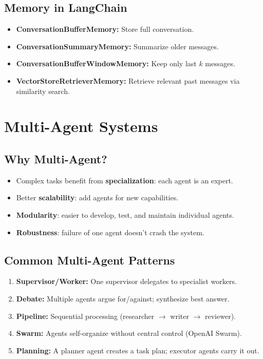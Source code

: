 \documentclass[11pt,a4paper]{article}
\begin{document}
\subsection{Memory in LangChain}
\begin{itemize}[nosep]
  \item \textbf{ConversationBufferMemory:} Store full conversation.
  \item \textbf{ConversationSummaryMemory:} Summarize older messages.
  \item \textbf{ConversationBufferWindowMemory:} Keep only last $k$ messages.
  \item \textbf{VectorStoreRetrieverMemory:} Retrieve relevant past messages via similarity search.
\end{itemize}

\section{Multi-Agent Systems}

\subsection{Why Multi-Agent?}
\begin{itemize}[nosep]
  \item Complex tasks benefit from \textbf{specialization}: each agent is an expert.
  \item Better \textbf{scalability}: add agents for new capabilities.
  \item \textbf{Modularity}: easier to develop, test, and maintain individual agents.
  \item \textbf{Robustness}: failure of one agent doesn't crash the system.
\end{itemize}

\subsection{Common Multi-Agent Patterns}
\begin{enumerate}[nosep]
  \item \textbf{Supervisor/Worker:} One supervisor delegates to specialist workers.
  \item \textbf{Debate:} Multiple agents argue for/against; synthesize best answer.
  \item \textbf{Pipeline:} Sequential processing (researcher $\to$ writer $\to$ reviewer).
  \item \textbf{Swarm:} Agents self-organize without central control (OpenAI Swarm).
  \item \textbf{Planning:} A planner agent creates a task plan; executor agents carry it out.
\end{enumerate}
\end{document}
